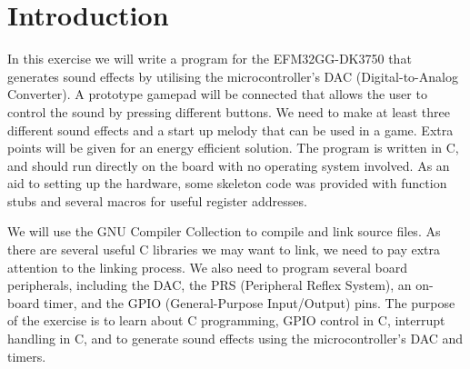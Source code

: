 \chapter{Introduction}


In this exercise we will write a program for the EFM32GG-DK3750 that generates sound effects by utilising the microcontroller's DAC (Digital-to-Analog Converter). A prototype gamepad will be connected that allows the user to control the sound by pressing different buttons. We need to make at least three different sound effects and a start up melody that can be used in a game. Extra points will be given for an energy efficient solution. The program is written in C, and should run directly on the board with no operating system involved. As an aid to setting up the hardware, some skeleton code was provided with function stubs and several macros for useful register addresses.

We will use the GNU Compiler Collection to compile and link source files. As there are several useful C libraries we may want to link, we need to pay extra attention to the linking process. We also need to program several board peripherals, including the DAC, the PRS (Peripheral Reflex System), an on-board timer, and the GPIO (General-Purpose Input/Output) pins. The purpose of the exercise is to learn about C programming, GPIO control in C, interrupt handling in C, and to generate sound effects using the microcontroller's DAC and timers.\cite{compendium}

